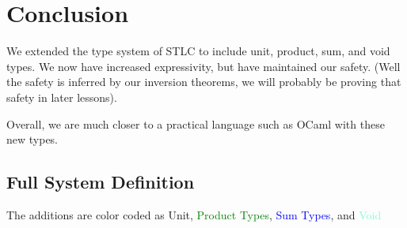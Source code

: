 \documentclass{lecturenotes}
\newcommand{\bl}[1]{\textcolor{blue}{#1}}
\newcommand{\g}[1]{\textcolor{Green}{#1}}
\newcommand{\re}[1]{\textcolor{BrickRed}{#1}}
\newcommand{\aq}[1]{\textcolor{Aquamarine}{#1}}
\begin{document}
\section{Conclusion }

We extended the type system of STLC to include unit, product, sum, and void types. 
  We now have increased expressivity, but have maintained our safety. (Well the safety is inferred by our inversion theorems, we will probably be proving that safety in later lessons). 

Overall, we are much closer to a practical language such as OCaml with these new types. 

\newpage

\subsection{Full System Definition} \label{sysdefn}

The additions are color coded as \re{Unit}, \g{Product Types}, \bl{Sum Types}, and \aq{Void}
\end{document}
